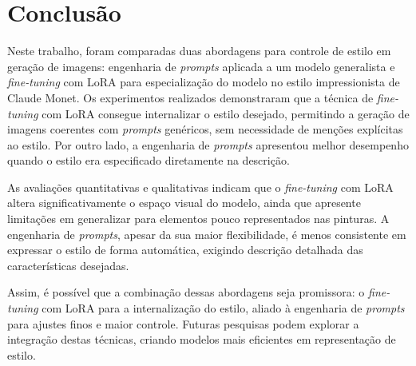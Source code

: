 \section{Conclusão}

Neste trabalho, foram comparadas duas abordagens para controle de estilo em geração de imagens: engenharia de \textit{prompts} aplicada a um modelo generalista e \textit{fine-tuning} com LoRA para especialização do modelo no estilo impressionista de Claude Monet. Os experimentos realizados demonstraram que a técnica de \textit{fine-tuning} com LoRA consegue internalizar o estilo desejado, permitindo a geração de imagens coerentes com \textit{prompts} genéricos, sem necessidade de menções explícitas ao estilo. Por outro lado, a engenharia de \textit{prompts} apresentou melhor desempenho quando o estilo era especificado diretamente na descrição.

As avaliações quantitativas e qualitativas indicam que o \textit{fine-tuning} com LoRA altera significativamente o espaço visual do modelo, ainda que apresente limitações em generalizar para elementos pouco representados nas pinturas. A engenharia de \textit{prompts}, apesar da sua maior flexibilidade, é menos consistente em expressar o estilo de forma automática, exigindo descrição detalhada das características desejadas.

Assim, é possível que a combinação dessas abordagens seja promissora: o \textit{fine-tuning} com LoRA para a internalização do estilo, aliado à engenharia de \textit{prompts} para ajustes finos e maior controle. Futuras pesquisas podem explorar a integração destas técnicas, criando modelos mais eficientes em representação de estilo.

